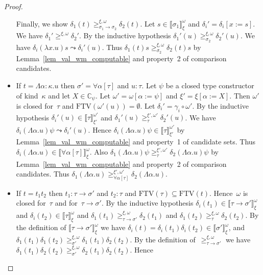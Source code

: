 \documentclass[a4paper,UKenglish,cleveref,autoref,numberwithinsect]{lipics-v2019}
\theoremstyle{definition}
\newcommand{\arrtype}{\rightarrow}
\newcommand{\subst}[2]{#1:=#2}
\newcommand{\abs}[2]{\lambda #1.#2}
\newcommand{\tabs}[2]{\Lambda #1.#2}
\newcommand{\FTV}{\mathrm{FTV}}
\newcommand{\Cb}{\mathbb{C}}
\newcommand{\val}[3]{\ensuremath{\llbracket#1\rrbracket_{#2}^{#3}}}
\newcommand{\gteq}[3]{\ensuremath{\ge_{#1}^{#2,#3}}}
\begin{document}
\begin{proof}
\begin{itemize}
    Finally, we show $\delta_1(t)
    \gteq{\sigma_1\arrtype\sigma_2}{\xi}{\omega} \delta_2(t)$. Let $s
    \in \val{\sigma_1}{\xi}{\omega}$ and
    $\delta_i'=\delta_i[\subst{x}{s}]$. We have $\delta_1'
    \gteq{}{\xi}{\omega} \delta_2'$. By the inductive hypothesis
    $\delta_1'(u) \gteq{\sigma_2}{\xi}{\omega} \delta_2'(u)$. We have
    $\delta_i(\abs{x}{u}) s \leadsto \delta_i'(u)$. Thus $\delta_1(t)
    s \gteq{\sigma_2}{\xi}{\omega} \delta_2(t) s$ by
    Lemma~\ref{lem_val_wm_computable} and property~2 of comparison
    candidates.
  \item If $t = \tabs{\alpha:\kappa}{u}$ then $\sigma' =
    \forall\alpha[\tau]$ and $u : \tau$. Let $\psi$ be a closed type
    constructor of kind~$\kappa$ and let $X \in \Cb_\psi$. Let
    $\omega' = \omega[\subst{\alpha}{\psi}]$ and
    $\xi'=\xi[\subst{\alpha}{X}]$. Then $\omega'$ is closed for~$\tau$
    and $\FTV(\omega'(u)) = \emptyset$. Let
    $\delta_i'=\gamma_i\circ\omega'$. By the inductive hypothesis
    $\delta_i'(u) \in \val{\tau}{\xi'}{\omega'}$ and $\delta_1'(u)
    \gteq{\tau}{\xi'}{\omega'} \delta_2'(u)$. We have
    $\delta_i(\tabs{\alpha}{u}) \psi \leadsto \delta_i'(u)$. Hence
    $\delta_i(\tabs{\alpha}{u}) \psi \in \val{\tau}{\xi'}{\omega'}$ by
    Lemma~\ref{lem_val_wm_computable} and property~1 of candidate
    sets. Thus $\delta_i(\tabs{\alpha}{u}) \in
    \val{\forall\alpha[\tau]}{\xi}{\omega}$. Also
    $\delta_1(\tabs{\alpha}{u}) \psi \gteq{\tau}{\xi'}{\omega'}
    \delta_2(\tabs{\alpha}{u}) \psi$ by
    Lemma~\ref{lem_val_wm_computable} and property~2 of comparison
    candidates. Thus $\delta_1(\tabs{\alpha}{u})
    \gteq{\forall\alpha[\tau]}{\xi'}{\omega'}
    \delta_2(\tabs{\alpha}{u})$.
  \item If $t = t_1 t_2$ then $t_1 : \tau\arrtype\sigma'$ and $t_2 :
    \tau$ and $\FTV(\tau) \subseteq \FTV(t)$. Hence~$\omega$ is closed
    for~$\tau$ and for~$\tau\arrtype\sigma'$. By the inductive
    hypothesis $\delta_i(t_1) \in
    \val{\tau\arrtype\sigma'}{\xi}{\omega}$ and $\delta_i(t_2) \in
    \val{\tau}{\xi}{\omega}$ and $\delta_1(t_1)
    \gteq{\tau\arrtype\sigma'}{\xi}{\omega} \delta_2(t_1)$ and
    $\delta_1(t_2) \gteq{\tau}{\xi}{\omega} \delta_2(t_2)$. By the
    definition of $\val{\tau\arrtype\sigma'}{\xi}{\omega}$ we have
    $\delta_i(t) = \delta_i(t_1)\delta_i(t_2) \in
    \val{\sigma'}{\xi}{\omega}$, and $\delta_1(t_1)\delta_1(t_2)
    \gteq{\sigma'}{\xi}{\omega} \delta_1(t_1)\delta_2(t_2)$. By the
    definition of~$\gteq{\tau\arrtype\sigma'}{\xi}{\omega}$ we have
    $\delta_1(t_1)\delta_2(t_2)\gteq{\sigma'}{\xi}{\omega}\delta_2(t_1)\delta_2(t_2)$. Hence

\end{itemize}
\end{proof}
\end{document}
